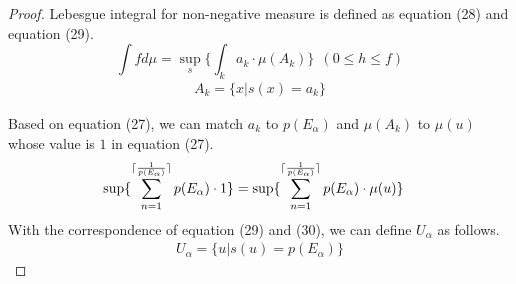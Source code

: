 \begin{proof}
Lebesgue integral for non-negative measure is defined as equation (28) and equation (29). 
\begin{equation}
\label{APP_D_def:lebesgue_integral}
\int f d\mu  = \sup_s\{\int_k a_k \cdot \mu(A_k)\}\ \ (0 \le h \le  f)
\end{equation}
\begin{equation}
    \label{def:lebesgue_measurable_set}
    \begin{split}
        A_k = \{ x | s(x)=a_k \}
    \end{split}
\end{equation}

Based on equation (27), we can match $a_k$ to $p(E_{\alpha})$ and $\mu(A_k)$ to $\mu(u)$ 
whose value is $1$ in equation (27).
\begin{align}
\label{connect_entropy_msc}
\begin{split}
\sup\{\sum_{n=1}^{\lceil{1 \over p(E_\alpha)}\rceil}p(E_\alpha) \cdot 1\} 
&= \sup\{\sum_{n=1}^{\lceil{1 \over p(E_\alpha)}\rceil}p(E_\alpha)\cdot \mu(u)\}
\end{split}
\end{align}
With the correspondence of equation (29) and (30), we can define $U_{\alpha}$ as follows. 
\begin{equation}
    \label{lebesgue_set_for_entropy}
    \begin{split}
        U_{\alpha} = \{ u | s(u)=p({E_{\alpha}}) \}
    \end{split}
\end{equation}


\end{proof}
